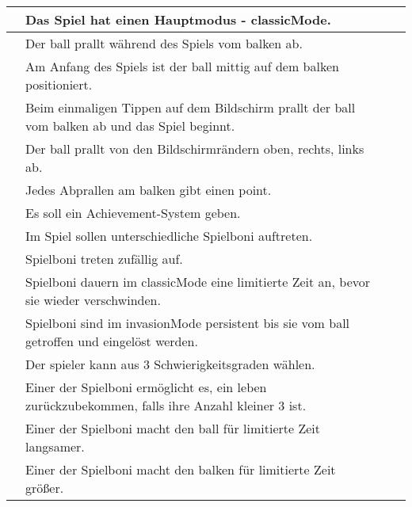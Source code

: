 \begin{xltabular}{\textwidth}{|l|X|r|r|}
    \setSystem{\ref*{sys:cm}}   %
    
      & Das Spiel hat einen Hauptmodus - \gls{classicMode}.        &      &      \\ \hline
      & Der \gls{ball} prallt während des Spiels vom \gls{balken} ab.              &      &      \\ \hline
      & Am Anfang des Spiels ist der \gls{ball} mittig auf dem \gls{balken} positioniert.              &      &      \\ \hline
      & Beim einmaligen Tippen auf dem Bildschirm prallt der \gls{ball} vom \gls{balken} ab und das Spiel beginnt.              &      &      \\ \hline
      & Der \gls{ball} prallt von den Bildschirmrändern oben, rechts, links ab.              &      &      \\ \hline
      & Jedes Abprallen am \gls{balken} gibt einen \gls{point}.              &      &      \\ \hline
      & \OPT{*} Es soll ein Achievement-System geben. &      &   \\ \hline
      & \OPT{*} Im Spiel sollen unterschiedliche Spielboni auftreten.        &      &      \\ \hline
      & \OPT{*} Spielboni treten zufällig auf.              &      &      \\ \hline
      & \OPT{*} Spielboni dauern im \gls{classicMode} eine limitierte Zeit an, bevor sie wieder verschwinden.              &      &      \\ \hline
      & \OPT{*} Spielboni sind im \gls{invasionMode} persistent bis sie vom \gls{ball} getroffen und eingelöst werden.              &      &      \\ \hline
      & Der \gls{spieler} kann aus 3 Schwierigkeitsgraden wählen.        &      &      \\ \hline
      & \OPT{*} Einer der Spielboni ermöglicht es, ein \gls{leben} zurückzubekommen, falls ihre Anzahl kleiner 3 ist.            &      &      \\ \hline
      & \OPT{*} Einer der Spielboni macht den \gls{ball} für limitierte Zeit langsamer.            &      &      \\ \hline
      & \OPT{*} Einer der Spielboni macht den \gls{balken} für limitierte Zeit größer.            &      &      \\ \hline


\end{xltabular}
